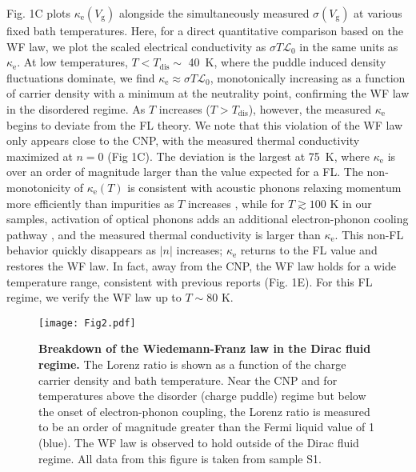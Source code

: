\documentclass[10pt, oneside]{book}
\begin{document}
\begin{doublespace}
Fig. 1C plots $\kappa_{\mathrm{e}}(V_{\mathrm{g}})$ alongside the simultaneously measured $\sigma(V_{\mathrm{g}})$ at various fixed bath temperatures. Here, for a direct quantitative comparison based on the WF law, we plot the scaled electrical conductivity as $\sigma T\mathcal{L}_0$ in the same units as $\kappa_{\mathrm{e}}$. At low temperatures, $T<T_{\mathrm{dis}}\sim$ 40~K, where the puddle induced density fluctuations dominate, we find $\kappa_{\mathrm{e}}\approx\sigma T\mathcal{L}_0$, monotonically increasing as a function of carrier density with a minimum at the neutrality point, confirming the WF law in the disordered regime. As $T$ increases ($T>T_{\mathrm{dis}}$), however, the measured $\kappa_{\mathrm{e}}$ begins to deviate from the FL theory. We note that this violation of the WF law only appears close to the CNP, with the measured thermal conductivity maximized at $n=0$ (Fig 1C). 
The deviation is the largest at  75~K, where $\kappa_{\mathrm{e}}$ is over an order of magnitude larger than the value expected for a FL.  The non-monotonicity of $\kappa_{\mathrm{e}}(T)$ is consistent with acoustic phonons relaxing momentum more efficiently than impurities as $T$ increases \cite{Lucas:2015lna}, while for $T\gtrsim 100$ K in our samples, activation of  optical phonons adds an additional electron-phonon cooling pathway \cite{crossno2}, and the measured thermal conductivity is larger than $\kappa_{\mathrm{e}}$. This non-FL behavior quickly disappears as $|n|$ increases; $\kappa_{\mathrm{e}}$ returns to the FL value and restores the WF law.   In fact, away from the CNP, the WF law holds for a wide temperature range, consistent with previous reports \cite{crossno2, yigen, fong2} (Fig. 1E).    For this FL regime, we verify the WF law up to $T \sim 80$ K. 

\begin{figure}
\texttt{[image: Fig2.pdf]}
\centering
\caption{\textbf{Breakdown of the Wiedemann-Franz law in the Dirac fluid regime.} The Lorenz ratio is shown as a function of the charge carrier density and bath temperature. Near the CNP and for temperatures above the disorder (charge puddle) regime but below the onset of electron-phonon coupling, the Lorenz ratio is measured to be an order of magnitude greater than the Fermi liquid value of 1 (blue). The WF law is observed to hold outside of the Dirac fluid regime.  All data from this figure is taken from sample S1.}
\label{Fig2}
\end{figure}


\end{doublespace}
\end{document}
